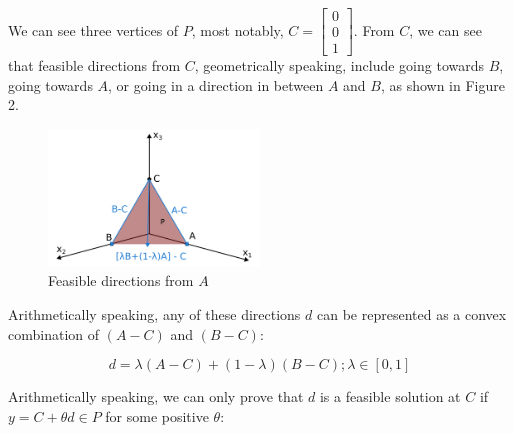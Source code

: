\documentclass[11pt]{article}
\begin{document}
We can see three vertices of $P$, most notably, $C=\begin{bmatrix}0\\0\\1\end{bmatrix}$. From $C$, we can see that feasible directions from $C$, geometrically speaking, include going towards $B$, going towards $A$, or going in a direction in between $A$ and $B$, as shown in Figure 2.

\begin{figure}[h]
\includegraphics[width=0.5\textwidth]{5_feasible_directions}
\centering
\caption{Feasible directions from $A$}
\end{figure}

 Arithmetically speaking, any of these directions $d$ can be represented as a convex combination of $(A-C)$ and $(B-C)$: 

\begin{equation}
d=\lambda(A-C) + (1-\lambda) (B-C); \lambda\in[0, 1]
\end{equation}

Arithmetically speaking, we can only prove that $d$ is a feasible solution at $C$ if $y=C+\theta d\in P$ for some positive $\theta$:
\end{document}
